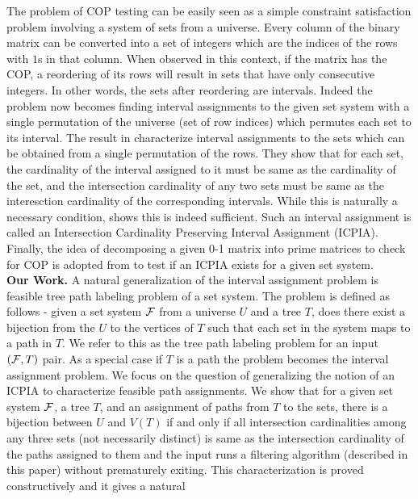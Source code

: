 \documentclass{fsttcs}
\def\cF{{\cal F}}
\begin{document}
\noindent
The problem of COP testing can be easily seen as a simple constraint
satisfaction problem involving a system of sets from a universe. Every
column of the binary matrix can be converted into a set of integers
which are the indices of the rows with $1$s in that column. When
observed in this context, if the matrix has the COP, a reordering of its
rows will result in sets that have only consecutive integers. In other
words, the sets after reordering are intervals. Indeed the problem now
becomes finding 
interval assignments to the given set system \cite{nsnrs09} with a
single permutation of the universe (set of row indices) which permutes each
set to its interval. The result in \cite{nsnrs09} characterize
interval assignments to the sets which can be obtained from a single
permutation of the rows.  They show that for each set, the cardinality
of the interval assigned to it must be same as the cardinality of the set,
and the intersection cardinality of any two sets must be same as the
interesction cardinality of the corresponding intervals.  While this
is naturally a necessary condition, \cite{nsnrs09} shows this is indeed
sufficient.  Such an interval assignment is called an Intersection
Cardinality Preserving Interval Assignment (ICPIA).  Finally, the idea of
decomposing a given 0-1 matrix into prime matrices to check for COP is
adopted from 
\cite{wlh02} to test if an ICPIA exists for a given set system.\\
{\bf Our Work.}
A natural generalization of the interval assignment problem is
feasible tree path labeling problem of a set system. The problem is
defined as follows - given a set system 
$\cF$ from a universe $U$ and a tree $T$, does there exist a bijection
from the $U$ to the vertices of $T$ such that each set in the system
maps to a path in $T$.  We refer to this as the tree path labeling
problem for an input $(\cF,T)$ pair. As a special case if $T$ is a path
the problem becomes the interval assignment problem.  We focus on the
question of generalizing the notion of an ICPIA \cite{nsnrs09} to
characterize feasible path assignments.  We show that for a given set
system $\cF$, a tree $T$, and an assignment of paths from $T$ to the sets,
there is a bijection between $U$ and $V(T)$ if and only if all
intersection cardinalities among any three sets (not necessarily distinct)
is same as the intersection cardinality of the paths assigned to them
and the input runs a filtering algorithm (described in
this paper) without prematurely exiting.
This characterization is proved constructively and it gives a natural
\end{document}
